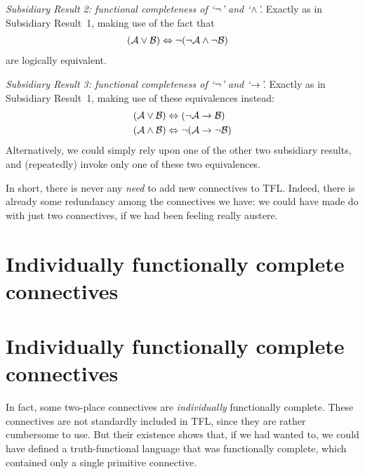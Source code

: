 \emph{Subsidiary Result 2: functional completeness of `$\neg$' and `$\wedge$'.} Exactly as in Subsidiary Result~1, making use of the fact that
		\begin{align*}
		(\mathcal{A} \vee \mathcal{B}) & \Leftrightarrow \neg(\neg \mathcal{A} \wedge\neg \mathcal{B})
		\end{align*}
are logically equivalent.

\emph{Subsidiary Result 3: functional completeness of `$\neg$' and `$\rightarrow$'.} Exactly as in Subsidiary Result~1, making use of these equivalences instead:
		\begin{align*}
		(\mathcal{A} \vee \mathcal{B}) &\Leftrightarrow (\neg \mathcal{A} \rightarrow \mathcal{B})\\
		(\mathcal{A} \wedge \mathcal{B}) &\Leftrightarrow \neg(\mathcal{A} \rightarrow \neg\mathcal{B})
		\end{align*}
Alternatively, we could simply rely upon one of the other two subsidiary results, and (repeatedly) invoke only one of these two equivalences.

In short, there is never any \emph{need} to add new connectives to TFL. Indeed, there is already some redundancy among the connectives we have: we could have made do with just two connectives, if we had been feeling really austere.

\ifHTMLtarget
\section{Individually functionally complete connectives}
\else
\section[Individually functionally complete connectives][Functionally complete connectives]{Individually functionally complete connectives}
\fi

In fact, some two-place connectives are \emph{individually} functionally complete. These connectives are not standardly included in TFL, since they are rather cumbersome to use. But their existence shows that, if we had wanted to, we could have defined a truth-functional language that was functionally complete, which contained only a single primitive connective.

